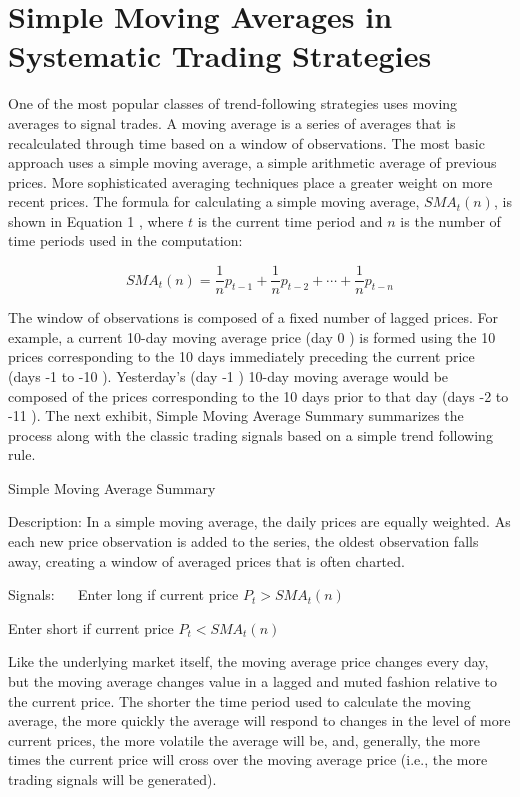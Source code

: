 \documentclass[11pt]{article}
\begin{document}
\section*{Simple Moving Averages in Systematic Trading Strategies}
One of the most popular classes of trend-following strategies uses moving averages to signal trades. A moving average is a series of averages that is recalculated through time based on a window of observations. The most basic approach uses a simple moving average, a simple arithmetic average of previous prices. More sophisticated averaging techniques place a greater weight on more recent prices. The formula for calculating a simple moving average, $S M A_{t}(n)$, is shown in Equation 1 , where $t$ is the current time period and $n$ is the number of time periods used in the computation:


\begin{equation*}
S M A_{t}(n)=\frac{1}{n} p_{t-1}+\frac{1}{n} p_{t-2}+\cdots+\frac{1}{n} p_{t-n} \tag{1}
\end{equation*}


The window of observations is composed of a fixed number of lagged prices. For example, a current 10-day moving average price (day 0 ) is formed using the 10 prices corresponding to the 10 days immediately preceding the current price (days -1 to -10 ). Yesterday's (day -1 ) 10-day moving average would be composed of the prices corresponding to the 10 days prior to that day (days -2 to -11 ). The next exhibit, Simple Moving Average Summary summarizes the process along with the classic trading signals based on a simple trend following rule.

Simple Moving Average Summary

Description: In a simple moving average, the daily prices are equally weighted. As each new price observation is added to the series, the oldest observation falls away, creating a window of averaged prices that is often charted.

Signals: $\quad$ Enter long if current price $P_{t}>S M A_{t}(n)$

Enter short if current price $P_{t}<S M A_{t}(n)$

Like the underlying market itself, the moving average price changes every day, but the moving average changes value in a lagged and muted fashion relative to the current price. The shorter the time period used to calculate the moving average, the more quickly the average will respond to changes in the level of more current prices, the more volatile the average will be, and, generally, the more times the current price will cross over the moving average price (i.e., the more trading signals will be generated).
\end{document}
